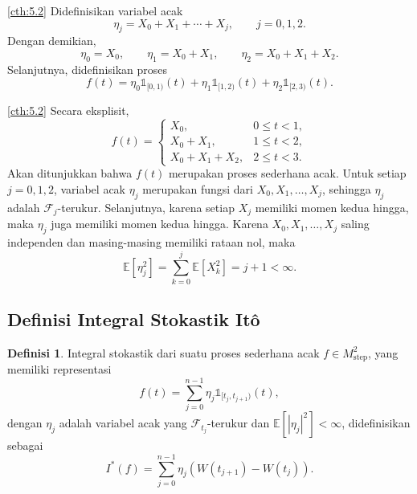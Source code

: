 \documentclass[aspectratio=169,11pt]{beamer}
\theoremstyle{definition}
\newtheorem{definisi}{Definisi}
\newcommand{\myref}[1]{\hyperref[#1]{\nameCref{#1} \ref*{#1}}}
\begin{document}
\begin{frame}{\insertsection}{\insertsubsection}
  \begin{exampleblock}{\myref{cth:5.2}}
    Didefinisikan variabel acak
    \[
      \eta_j=X_0+X_1+\cdots+X_j,
      \qquad
      j=0,1,2.
    \]
    Dengan demikian,
    \[
      \eta_0=X_0,\qquad
      \eta_1=X_0+X_1,\qquad
      \eta_2=X_0+X_1+X_2.
    \]
    Selanjutnya, didefinisikan proses
    \[
      f(t)
      =
      \eta_0\mathds{1}_{[0,1)}(t)
      +\eta_1\mathds{1}_{[1,2)}(t)
      +\eta_2\mathds{1}_{[2,3)}(t).
    \]
  \end{exampleblock}
\end{frame}

\begin{frame}{\insertsection}{\insertsubsection}
  \begin{exampleblock}{\myref{cth:5.2}}
    Secara eksplisit,
    \[
      f(t)=
      \begin{cases}
        X_0,         & 0\leq t<1, \\
        X_0+X_1,     & 1\leq t<2, \\
        X_0+X_1+X_2, & 2\leq t<3.
      \end{cases}
    \]
    Akan ditunjukkan bahwa $f(t)$ merupakan proses sederhana acak. Untuk setiap
    $j=0,1,2$, variabel acak $\eta_j$ merupakan fungsi dari
    $X_0,X_1,\ldots,X_j$, sehingga $\eta_j$ adalah $\mathcal{F}_j$-terukur.
    Selanjutnya, karena setiap $X_j$ memiliki momen kedua hingga, maka $\eta_j$
    juga memiliki momen kedua hingga. Karena $X_0,X_1,\ldots,X_j$ saling independen dan masing-masing memiliki rataan
    nol, maka
    \[
      \mathbb{E}[\eta_j^2]
      =
      \sum_{k=0}^{j}\mathbb{E}[X_k^2]
      =
      j+1
      <\infty.
    \]
  \end{exampleblock}
\end{frame}

\subsection{Definisi Integral Stokastik Itô}
\begin{frame}{\insertsection}{\insertsubsection}
  \begin{definisi}\label{def:integral_stokastik}
    Integral stokastik dari suatu proses sederhana acak $f \in M_{\text{step}}^2$, yang memiliki representasi
    \begin{equation*}
      f(t) = \sum_{j=0}^{n-1} \eta_j \mathds{1}_{[t_j, t_{j+1})}(t),
    \end{equation*}
    dengan $\eta_j$ adalah variabel acak yang $\mathcal{F}_{t_j}$-terukur dan  $\mathbb{E}[|\eta_j|^2] < \infty$, didefinisikan sebagai
    \begin{equation*}
      I^*(f) = \sum_{j=0}^{n-1} \eta_j (W(t_{j+1}) - W(t_j)).
    \end{equation*}
  \end{definisi}
\end{frame}
\end{document}
